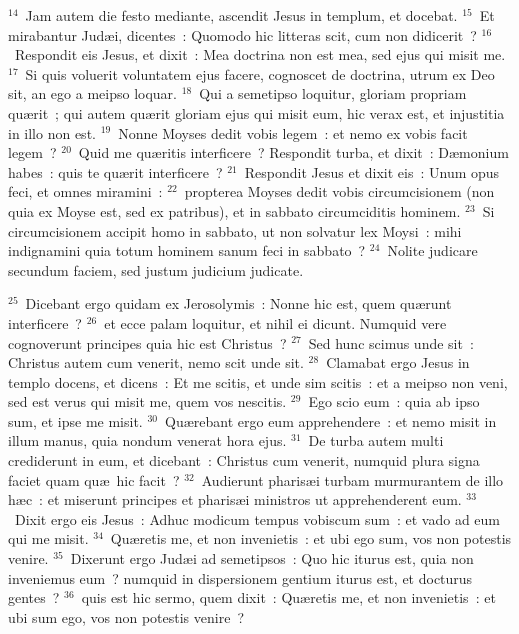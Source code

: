 ${}^{14}$~Jam autem die festo mediante, ascendit Jesus in templum, et docebat.
${}^{15}$~Et mirabantur Jud\ae i, dicentes~: Quomodo hic litteras scit, cum non didicerit~?
${}^{16}$~Respondit eis Jesus, et dixit~: Mea doctrina non est mea, sed ejus qui misit me.
${}^{17}$~Si quis voluerit voluntatem ejus facere, cognoscet de doctrina, utrum ex Deo sit, an ego a meipso loquar.
${}^{18}$~Qui a semetipso loquitur, gloriam propriam qu\ae rit~; qui autem qu\ae rit gloriam ejus qui misit eum, hic verax est, et injustitia in illo non est.
${}^{19}$~Nonne Moyses dedit vobis legem~: et nemo ex vobis facit legem~?
${}^{20}$~Quid me qu\ae ritis interficere~? Respondit turba, et dixit~: D\ae monium habes~: quis te qu\ae rit interficere~?
${}^{21}$~Respondit Jesus et dixit eis~: Unum opus feci, et omnes miramini~:
${}^{22}$~propterea Moyses dedit vobis circumcisionem (non quia ex Moyse est, sed ex patribus), et in sabbato circumciditis hominem.
${}^{23}$~Si circumcisionem accipit homo in sabbato, ut non solvatur lex Moysi~: mihi indignamini quia totum hominem sanum feci in sabbato~?
${}^{24}$~Nolite judicare secundum faciem, sed justum judicium judicate.


${}^{25}$~Dicebant ergo quidam ex Jerosolymis~: Nonne hic est, quem qu\ae runt interficere~?
${}^{26}$~et ecce palam loquitur, et nihil ei dicunt. Numquid vere cognoverunt principes quia hic est Christus~?
${}^{27}$~Sed hunc scimus unde sit~: Christus autem cum venerit, nemo scit unde sit.
${}^{28}$~Clamabat ergo Jesus in templo docens, et dicens~: Et me scitis, et unde sim scitis~: et a meipso non veni, sed est verus qui misit me, quem vos nescitis.
${}^{29}$~Ego scio eum~: quia ab ipso sum, et ipse me misit.
${}^{30}$~Qu\ae rebant ergo eum apprehendere~: et nemo misit in illum manus, quia nondum venerat hora ejus.
${}^{31}$~De turba autem multi crediderunt in eum, et dicebant~: Christus cum venerit, numquid plura signa faciet quam qu\ae\ hic facit~?
${}^{32}$~Audierunt pharis\ae i turbam murmurantem de illo h\ae c~: et miserunt principes et pharis\ae i ministros ut apprehenderent eum.
${}^{33}$~Dixit ergo eis Jesus~: Adhuc modicum tempus vobiscum sum~: et vado ad eum qui me misit.
${}^{34}$~Qu\ae retis me, et non invenietis~: et ubi ego sum, vos non potestis venire.
${}^{35}$~Dixerunt ergo Jud\ae i ad semetipsos~: Quo hic iturus est, quia non inveniemus eum~? numquid in dispersionem gentium iturus est, et docturus gentes~?
${}^{36}$~quis est hic sermo, quem dixit~: Qu\ae retis me, et non invenietis~: et ubi sum ego, vos non potestis venire~?



